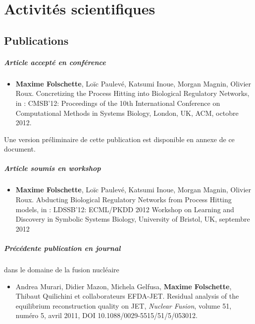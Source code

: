 \chapter{Activités scientifiques}

\section{Publications}\label{sec:publications}

\paragraph{Article accepté en conférence}
\begin{itemize}
\item[] \textbf{Maxime Folschette}, Loïc Paulevé, Katsumi Inoue, Morgan Magnin, Olivier Roux.
Concretizing the Process Hitting into Biological Regulatory Networks,
in : CMSB'12\!\!: Proceedings of the 10th International Conference on Computational Methods in Systems Biology,
London, UK, ACM, octobre 2012.
\end{itemize}
Une version préliminaire de cette publication est disponible en annexe de ce document.

\paragraph{Article soumis en workshop}
\begin{itemize}
\item[] \textbf{Maxime Folschette}, Loïc Paulevé, Katsumi Inoue, Morgan Magnin, Olivier Roux.
Abducting Biological Regulatory Networks from Process Hitting models,
in : LDSSB'12\!\!: ECML/PKDD 2012 Workshop on Learning and Discovery in Symbolic Systems Biology,
University of Bristol, UK, septembre 2012
\end{itemize}

\paragraph{Précédente publication en journal} dans le domaine de la fusion nucléaire
\begin{itemize}
\item[] Andrea Murari, Didier Mazon, Michela Gelfusa, \textbf{Maxime Folschette}, Thibaut Quilichini et collaborateurs EFDA-JET.
Residual analysis of the equilibrium reconstruction quality on JET, \textit{Nuclear Fusion},
volume 51, numéro 5, avril 2011, DOI 10.1088/0029-5515/51/5/053012.
\end{itemize}



